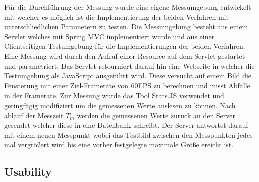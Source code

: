 Für die Durchführung der Messung wurde eine eigene Messumgebung entwickelt mit welcher es möglich ist die Implementierung der beiden Verfahren mit unterschliedlichen Parametern zu testen.
Die Messumgebung besteht aus einem Servlet welches mit Spring MVC implementiert wurde und aus einer Clientseitigen Testumgebung für die Implementierungen der beiden Verfahren.
Eine Messung wird durch den Aufruf einer Resource auf dem Servlet gestartet und parametriert.
Das Servlet retourniert darauf hin eine Webseite in welcher die Testumgebung als JavaScript ausgeführt wird.
Diese versucht auf einem Bild die Fensterung mit einer Ziel-Framerate von 60FPS zu berechnen und misst Abfälle in der Framerate.
Zur Messung wurde das Tool Stats.JS verwendet und geringfügig modifiziert um die gemessenen Werte auslesen zu können.
Nach ablauf der Messzeit $T_m$ werden die gemessenen Werte zurück an den Server gesendet welcher diese in eine Datenbank schreibt.
Der Server antwortet darauf mit einem neuen Messpunkt wobei das Testbild zwischen den Messpunkten jedes mal vergrößert wird bis eine vorher festgelegte maximale Größe ereicht ist.



\subsection{Usability}
\label{sec:Usability}
